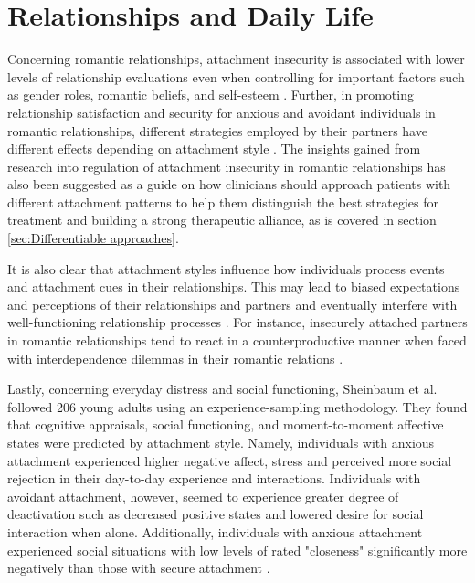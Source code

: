 \documentclass[12pt]{report}
\begin{document}
\section{Relationships and Daily Life}
Concerning romantic relationships, attachment insecurity is associated with lower levels of relationship evaluations even when controlling for important factors such as gender roles, romantic beliefs, and self-esteem \cite{Rodriguez2021, Jones1996}.
Further, in promoting relationship satisfaction and security for anxious and avoidant individuals in romantic relationships, different strategies employed by their partners have different effects depending on attachment style \cite{Overall2015}.
The insights gained from research into regulation of attachment insecurity in romantic relationships has also been suggested as a guide on how clinicians should approach patients with different attachment patterns to help them distinguish the best strategies for treatment and building a strong therapeutic alliance, as is covered in section \ref{sec:Differentiable approaches}.

It is also clear that attachment styles influence how individuals process events and attachment cues in their relationships. This may lead to biased expectations and perceptions of their relationships and partners and eventually interfere with well-functioning relationship processes \cite{Collins2007, Collins2004, Hazan1994, Mikulincer2003, Rodriguez2019}.
For instance, insecurely attached partners in romantic relationships tend to react in a counterproductive manner when faced with interdependence dilemmas in their romantic relations \cite{Simpson2012}.

Lastly, concerning everyday distress and social functioning, Sheinbaum et al. \citeyear{Sheinbaum2015} followed 206 young adults using an experience-sampling methodology.
They found that cognitive appraisals, social functioning, and moment-to-moment affective states were predicted by attachment style.
Namely, individuals with anxious attachment experienced higher negative affect, stress and perceived more social rejection in their day-to-day experience and interactions. Individuals with avoidant attachment, however, seemed to experience greater degree of deactivation such as decreased positive states and lowered desire for social interaction when alone.
Additionally, individuals with anxious attachment experienced social situations with low levels of rated "closeness" significantly more negatively than those with secure attachment \cite{Sheinbaum2015}.
\end{document}
